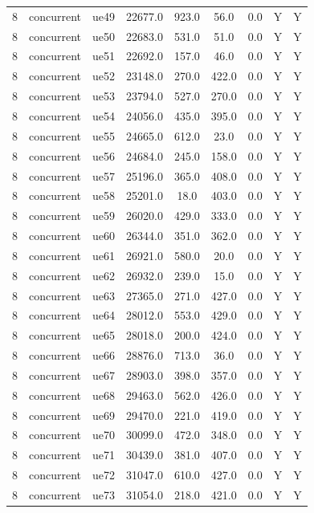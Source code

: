 \begin{table}[ht]
\begin{tabular}{|c|c|c|c|c|c|c|c|c|}
8 & concurrent & ue49 & 22677.0 & 923.0 & 56.0 & 0.0 & Y & Y \\
8 & concurrent & ue50 & 22683.0 & 531.0 & 51.0 & 0.0 & Y & Y \\
8 & concurrent & ue51 & 22692.0 & 157.0 & 46.0 & 0.0 & Y & Y \\
8 & concurrent & ue52 & 23148.0 & 270.0 & 422.0 & 0.0 & Y & Y \\
8 & concurrent & ue53 & 23794.0 & 527.0 & 270.0 & 0.0 & Y & Y \\
8 & concurrent & ue54 & 24056.0 & 435.0 & 395.0 & 0.0 & Y & Y \\
8 & concurrent & ue55 & 24665.0 & 612.0 & 23.0 & 0.0 & Y & Y \\
8 & concurrent & ue56 & 24684.0 & 245.0 & 158.0 & 0.0 & Y & Y \\
8 & concurrent & ue57 & 25196.0 & 365.0 & 408.0 & 0.0 & Y & Y \\
8 & concurrent & ue58 & 25201.0 & 18.0 & 403.0 & 0.0 & Y & Y \\
8 & concurrent & ue59 & 26020.0 & 429.0 & 333.0 & 0.0 & Y & Y \\
8 & concurrent & ue60 & 26344.0 & 351.0 & 362.0 & 0.0 & Y & Y \\
8 & concurrent & ue61 & 26921.0 & 580.0 & 20.0 & 0.0 & Y & Y \\
8 & concurrent & ue62 & 26932.0 & 239.0 & 15.0 & 0.0 & Y & Y \\
8 & concurrent & ue63 & 27365.0 & 271.0 & 427.0 & 0.0 & Y & Y \\
8 & concurrent & ue64 & 28012.0 & 553.0 & 429.0 & 0.0 & Y & Y \\
8 & concurrent & ue65 & 28018.0 & 200.0 & 424.0 & 0.0 & Y & Y \\
8 & concurrent & ue66 & 28876.0 & 713.0 & 36.0 & 0.0 & Y & Y \\
8 & concurrent & ue67 & 28903.0 & 398.0 & 357.0 & 0.0 & Y & Y \\
8 & concurrent & ue68 & 29463.0 & 562.0 & 426.0 & 0.0 & Y & Y \\
8 & concurrent & ue69 & 29470.0 & 221.0 & 419.0 & 0.0 & Y & Y \\
8 & concurrent & ue70 & 30099.0 & 472.0 & 348.0 & 0.0 & Y & Y \\
8 & concurrent & ue71 & 30439.0 & 381.0 & 407.0 & 0.0 & Y & Y \\
8 & concurrent & ue72 & 31047.0 & 610.0 & 427.0 & 0.0 & Y & Y \\
8 & concurrent & ue73 & 31054.0 & 218.0 & 421.0 & 0.0 & Y & Y \\

\end{tabular}
\end{table}
